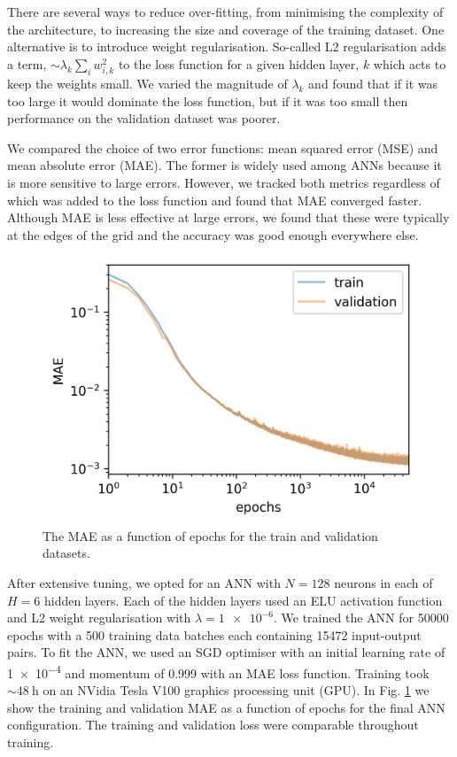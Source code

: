 There are several ways to reduce over-fitting, from minimising the complexity of the architecture, to increasing the size and coverage of the training dataset. One alternative is to introduce weight regularisation. So-called L2 regularisation adds a term, $\sim \lambda_k \sum_i w_{i, k}^2$ to the loss function for a given hidden layer, $k$ which acts to keep the weights small. We varied the magnitude of $\lambda_k$ and found that if it was too large it would dominate the loss function, but if it was too small then performance on the validation dataset was poorer.

We compared the choice of two error functions: mean squared error (MSE) and mean absolute error (MAE). The former is widely used among ANNs because it is more sensitive to large errors. However, we tracked both metrics regardless of which was added to the loss function and found that MAE converged faster. Although MAE is less effective at large errors, we found that these were typically at the edges of the grid and the accuracy was good enough everywhere else.

\begin{figure}[tb]
    \centering
    \includegraphics{figures/loss.png}
    \caption{The MAE as a function of epochs for the train and validation datasets.}
    \label{fig:loss}
\end{figure}

After extensive tuning, we opted for an ANN with $N=128$ neurons in each of $H=6$ hidden layers. Each of the hidden layers used an ELU activation function and L2 weight regularisation with $\lambda = \num{1e-6}$. We trained the ANN for \num{50000} epochs with a \num{500} training data batches each containing \num{15472} input-output pairs. To fit the ANN, we used an SGD optimiser with an initial learning rate of \num{1e-4} and momentum of \num{0.999} with an MAE loss function. Training took $\sim \SI{48}{\hour}$ on an NVidia Tesla V100 graphics processing unit (GPU). In Fig. \ref{fig:loss} we show the training and validation MAE as a function of epochs for the final ANN configuration. The training and validation loss were comparable throughout training.

